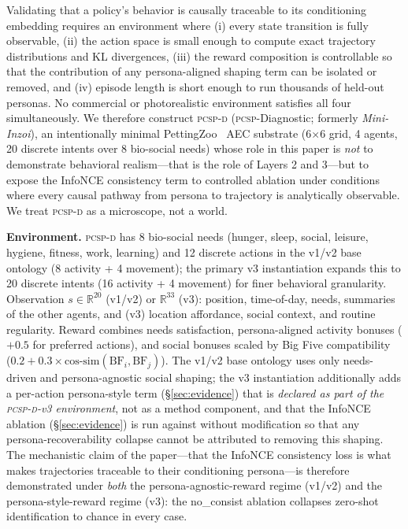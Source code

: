 \documentclass[conference]{IEEEtran}
\newcommand{\PCSP}{\textsc{pcsp}\xspace}
\newcommand{\PCSPD}{\textsc{pcsp-d}\xspace}
\begin{document}
Validating that a policy's behavior is causally traceable to its conditioning
embedding requires an environment where (i) every state transition is fully
observable, (ii) the action space is small enough to compute exact trajectory
distributions and KL divergences, (iii) the reward composition is controllable
so that the contribution of any persona-aligned shaping term can be isolated
or removed, and (iv) episode length is short enough to run thousands of held-out
personas. No commercial or photorealistic environment satisfies all four
simultaneously. We therefore construct \PCSPD{} (\PCSP-Diagnostic; formerly
\textit{Mini-Inzoi}), an intentionally minimal PettingZoo~\cite{terry2021pettingzoo} AEC substrate
(6$\times$6 grid, 4 agents, 20 discrete intents over 8 bio-social needs) whose
role in this paper is \emph{not} to demonstrate behavioral realism---that is
the role of Layers 2 and 3---but to expose the InfoNCE consistency term to
controlled ablation under conditions where every causal pathway from persona
to trajectory is analytically observable. We treat \PCSPD{} as a microscope,
not a world.

\textbf{Environment.}
\PCSPD{} has 8 bio-social needs (hunger, sleep, social, leisure, hygiene,
fitness, work, learning) and 12 discrete actions in the v1/v2 base ontology
(8 activity + 4 movement); the primary v3 instantiation expands this to 20
discrete intents (16 activity + 4 movement) for finer behavioral granularity.
Observation $s\!\in\!\mathbb{R}^{20}$ (v1/v2) or $\mathbb{R}^{33}$ (v3):
position, time-of-day, needs, summaries of the other agents, and (v3) location
affordance, social context, and routine regularity.
Reward combines needs satisfaction, persona-aligned activity bonuses ($+0.5$
for preferred actions), and social bonuses scaled by Big Five
compatibility~\cite{mccrae1992introduction,goldberg1990bigfive}
($0.2 + 0.3 \times \text{cos-sim}(\text{BF}_i, \text{BF}_j)$).
The v1/v2 base ontology uses only needs-driven and persona-agnostic social
shaping; the v3 instantiation additionally adds a per-action persona-style
term (\S\ref{sec:evidence}) that is \emph{declared as part of the
\PCSPD-v3 environment}, not as a method component, and that the InfoNCE
ablation (\S\ref{sec:evidence}) is run against without modification so that
any persona-recoverability collapse cannot be attributed to removing this
shaping. The mechanistic claim of the paper---that the InfoNCE consistency
loss is what makes trajectories traceable to their conditioning persona---is
therefore demonstrated under \emph{both} the persona-agnostic-reward regime
(v1/v2) and the persona-style-reward regime (v3): the no\_consist ablation
collapses zero-shot identification to chance in every case.
\end{document}
